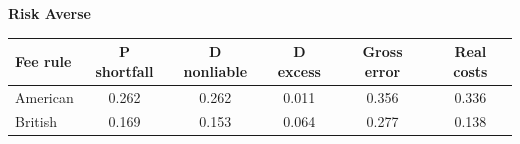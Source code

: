 \documentclass[10pt,border=5pt,varwidth=17cm]{standalone}
\begin{document}
\begingroup
\small
\setlength{\tabcolsep}{5pt}
\renewcommand{\arraystretch}{1.20}
\noindent\textbf{Risk Averse}\par\smallskip
\noindent\begin{tabularx}{\linewidth}{@{}>{\raggedright\arraybackslash}Xccccc@{}}
\toprule
\textbf{Fee rule} & \textbf{P shortfall} & \textbf{D nonliable} & \textbf{D excess} & \textbf{Gross error} & \textbf{Real costs} \\
\midrule
American & 0.262 & 0.262 & 0.011 & 0.356 & 0.336 \\
British & 0.169 & 0.153 & 0.064 & 0.277 & 0.138 \\
\bottomrule\end{tabularx}\par\medskip
\endgroup
\end{document}
